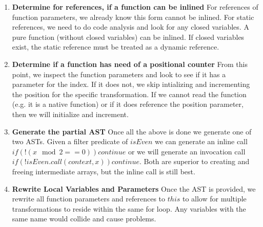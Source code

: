 \begin{enumerate}
  \item \textbf{Determine for references, if a function can be inlined}
    For references of function parameters, we already know this form cannot be inlined.  For static references, we need to do code analysis and look for any closed variables.  A pure function (without closed variables) can be inlined.  If closed variables exist, the static reference must be treated as a dynamic reference.
  \item \textbf{Determine if a function has need of a positional counter}
    From this point, we inspect the function parameters and look to see if it has a parameter for the index.  If it does not, we skip intializing and incrementing the position for the specific transformation.  If we cannot read the function (e.g. it is a native function) or if it does reference the position parameter, then we will initialize and increment.
  \item \textbf{Generate the partial AST}
    Once all the above is done we generate one of two ASTs. Given a filter predicate of $isEven$ we can generate an inline call $if (!(x \mod 2 == 0)) continue$ or we will generate an invocation call $if (!isEven.call(context, x)) continue$.  Both are superior to creating and freeing intermediate arrays, but the inline call is still best.
  \item \textbf{Rewrite Local Variables and Parameters}
    Once the AST is provided, we rewrite all function parameters and references to $this$ to allow for multiple transformations to reside within the same for loop.  Any variables with the same name would collide and cause problems.  
\end{enumerate}